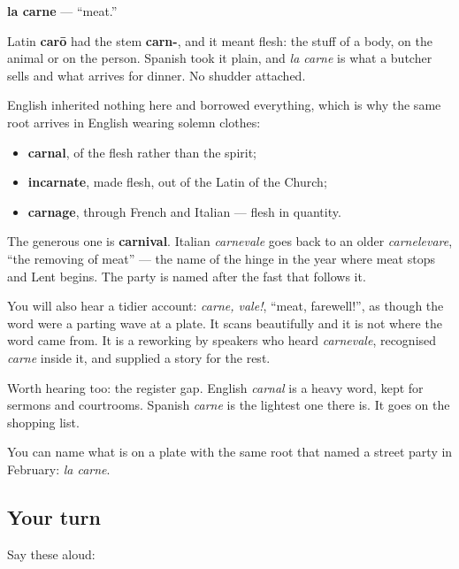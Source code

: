 \begin{cousinweb}
\textbf{la carne} — \textquotedblleft{}meat.\textquotedblright{}

Latin \textbf{carō} had the stem \textbf{carn-}, and it meant flesh: the stuff of a body, on the animal or on the person. Spanish took it plain, and \emph{la carne} is what a butcher sells and what arrives for dinner. No shudder attached.

English inherited nothing here and borrowed everything, which is why the same root arrives in English wearing solemn clothes:

\begin{itemize}
\raggedright
  \item \textbf{carnal}, of the flesh rather than the spirit;
  \item \textbf{incarnate}, made flesh, out of the Latin of the Church;
  \item \textbf{carnage}, through French and Italian — flesh in quantity.
\end{itemize}

The generous one is \textbf{carnival}. Italian \emph{carnevale} goes back to an older \emph{carnelevare}, \textquotedblleft{}the removing of meat\textquotedblright{} — the name of the hinge in the year where meat stops and Lent begins. The party is named after the fast that follows it.

You will also hear a tidier account: \emph{carne, vale!}, \textquotedblleft{}meat, farewell!\textquotedblright{}, as though the word were a parting wave at a plate. It scans beautifully and it is not where the word came from. It is a reworking by speakers who heard \emph{carnevale}, recognised \emph{carne} inside it, and supplied a story for the rest.

Worth hearing too: the register gap. English \emph{carnal} is a heavy word, kept for sermons and courtrooms. Spanish \emph{carne} is the lightest one there is. It goes on the shopping list.
\end{cousinweb}

\begin{grammarlens}[title={What you've built}]
You can name what is on a plate with the same root that named a street party in February: \emph{la carne}.
\end{grammarlens}

\subsection*{Your turn}
Say these aloud:

